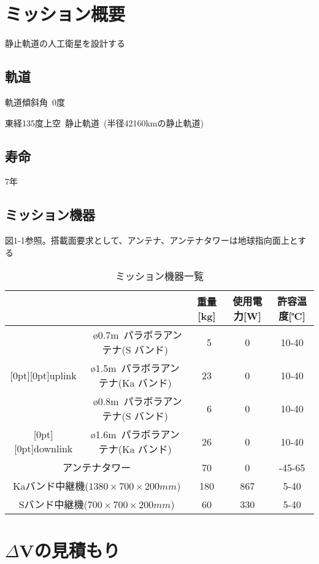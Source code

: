 \section{ミッション概要}
静止軌道の人工衛星を設計する

\subsection{軌道}
軌道傾斜角\ 0度 \par
東経135度上空\ 静止軌道\ (半径42160kmの静止軌道)

\subsection{寿命}
7年

\subsection{ミッション機器}
図1-1参照。搭載面要求として、アンテナ、アンテナタワーは地球指向面上とする\par\medskip
\begin{table}[H]
  \caption{ミッション機器一覧}
\begin{tabular}{|c|c|c|c|c|} \hline
  \multicolumn{2}{|c|}{} & 重量[kg] & 使用電力[W] & 許容温度[℃] \\ \hline
   & \o0.7m\ パラボラアンテナ(S バンド) & 5 & 0 & 10-40 \\ \cline{2-5}
   \raisebox{.5\normalbaselineskip}[0pt][0pt]{uplink}
   & \o1.5m\ パラボラアンテナ(Ka バンド) & 23 & 0 & 10-40 \\ \hline
   & \o0.8m\ パラボラアンテナ(S バンド) & 6 & 0 & 10-40 \\ \cline{2-5}
   \raisebox{.5\normalbaselineskip}[0pt][0pt]{downlink}
   & \o1.6m\ パラボラアンテナ(Ka バンド) & 26 & 0 & 10-40 \\ \hline
   \multicolumn{2}{|c|}{アンテナタワー} & 70 & 0 & -45-65 \\ \hline
   \multicolumn{2}{|c|}{Kaバンド中継機($1380\times700\times200mm$)} & 180 & 867 & 5-40 \\ \hline
   \multicolumn{2}{|c|}{Sバンド中継機($700\times700\times200mm$)} & 60 & 330 & 5-40 \\ \hline
\end{tabular}\par\medskip
\end{table}
\newpage

\section{$\Delta$Vの見積もり}
